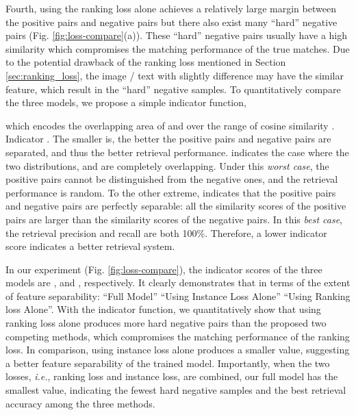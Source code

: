 \documentclass[10pt,final,journal]{IEEEtran}
\newcommand{\ie}{\mbox{\emph{i.e.}}}
\begin{document}
Fourth, using the ranking loss alone achieves a relatively large margin between the positive pairs and negative pairs but there also exist many ``hard'' negative pairs (Fig. \ref{fig:loss-compare}(a)).  These ``hard'' negative pairs usually have a high similarity which compromises the matching performance of the true matches. Due to the potential drawback of the ranking loss mentioned in Section \ref{sec:ranking_loss}, the image / text with slightly difference may have the similar feature, which result in the ``hard'' negative samples. To quantitatively compare the three models, we propose a simple indicator function,

which encodes the overlapping area of  and  over the range of cosine similarity . Indicator . The smaller  is, the better the positive pairs and negative pairs are separated, and thus the better retrieval performance.  indicates the case where the two distributions,  and  are completely overlapping. Under this \emph{worst case}, the positive pairs cannot be distinguished from the negative ones, and the retrieval performance is random. To the other extreme,  indicates that the positive pairs and negative pairs are perfectly separable: all the similarity scores of the positive pairs are larger than the similarity scores of the negative pairs. In this \emph{best case}, the retrieval precision and recall are both 100\%.
Therefore, a lower indicator score  indicates a better retrieval system. 

In our experiment (Fig. \ref{fig:loss-compare}), the indicator scores of the three models are ,  and , respectively. It clearly demonstrates that in terms of the extent of feature separability: ``Full Model''  ``Using Instance Loss Alone''  ``Using Ranking loss Alone''. With the indicator function, we quantitatively show that using ranking loss alone produces more hard negative pairs than the proposed two competing methods, which compromises the matching performance of the ranking loss. In comparison, using instance loss alone produces a smaller  value, suggesting a better feature separability of the trained model. Importantly, when the two losses, \ie, ranking loss and instance loss, are combined, our full model has the smallest  value, indicating the fewest hard negative samples and the best retrieval accuracy among the three methods.
\end{document}

